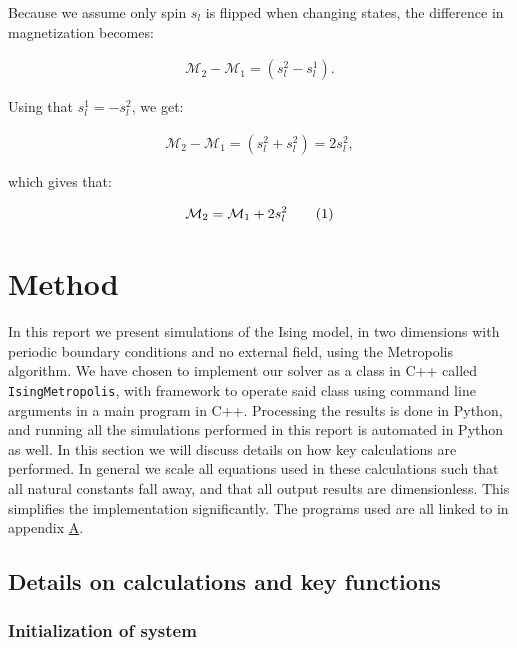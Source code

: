 \documentclass[reprint,english,notitlepage]{revtex4-1}  %
\newcommand\numberthis{\addtocounter{equation}{1}\tag{\theequation}}
\begin{document}
Because we assume only spin \(s_{l}\) is flipped when changing states, the difference in magnetization becomes:

\begin{align*}
 	\mathcal{M}_2 - \mathcal{M}_{1} = \left(s_{l}^{2} - s_{l}^{1}\right).
\end{align*} 

Using that \(s_{l}^{1} = - s_{l}^{2}\), we get:

\begin{align*}
	\mathcal{M}_2 - \mathcal{M}_{1} = \left(s_{l}^{2} + s_{l}^{2}\right) = 2s_{l}^{2},
\end{align*}

which gives that:

\begin{align*}
	\mathcal{M}_2 = \mathcal{M}_1 + 2s_{l}^{2} \numberthis \label{eq:delta_m}
\end{align*}


\newpage

\section{Method} \label{sec:III}

In this report we present simulations of the Ising model, in two dimensions with periodic boundary conditions and no external field, using the Metropolis algorithm. We have chosen to implement our solver as a class in C++ called \verb+IsingMetropolis+, with framework to operate said class using command line arguments in a main program in C++. Processing the results is done in Python, and running all the simulations performed in this report is automated in Python as well. In this section we will discuss details on how key calculations are performed. In general we scale all equations used in these calculations such that all natural constants fall away, and that all output results are dimensionless. This simplifies the implementation significantly. The programs used are all linked to in appendix \hyperref[A]{A}.

\subsection{Details on calculations and key functions} \label{sec:III:a}

\subsubsection{Initialization of system} \label{sec:III:a:i}
\end{document}
